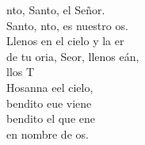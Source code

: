\begin{cancion}[Santo][Estepa]%
	nto, Santo, el Señor.\\
	Santo, nto, es nuestro os.\\
\jump
	Llenos en el cielo y la er\\
	de tu oria, Seor, llenos eán,\\
	llos T\\
\jump
	Hosanna eel cielo, \\
	bendito eue viene\\
	bendito el que ene \\
	en nombre de os.\\
\end{cancion}%
